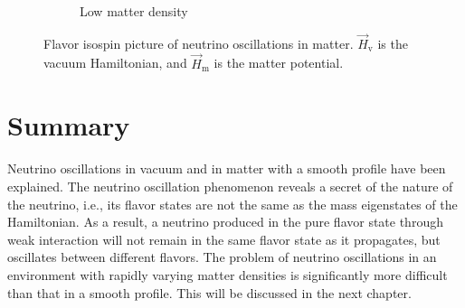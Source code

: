 \begin{figure}[htbp]
\begin{subfigure}[t]{0.3\textwidth}
    \vspace*{-0.05in}
		\caption{Low matter density}\label{chap:basics-sec:flavor-isospin-pic-fig:msw-adiabatic-small-density}
	\end{subfigure}
	\caption{Flavor isospin picture of neutrino oscillations in matter. $\vec H_{\mathrm v}$ is the vacuum Hamiltonian, and $\vec H_{\mathrm m}$ is the matter potential.}\label{chap:basics-sec:flavor-isospin-pic-fig:msw-adiabatic}
\end{figure}






\section{Summary}

Neutrino oscillations in vacuum and in matter with a smooth profile have been explained. The neutrino oscillation phenomenon reveals a secret of the nature of the neutrino, i.e., its flavor states are not the same as the mass eigenstates of the Hamiltonian.
As a result, a neutrino produced in the pure flavor state through weak interaction will not remain in the same flavor state as it propagates, but oscillates between different flavors. The problem of neutrino oscillations in an environment with rapidly varying matter densities is significantly more difficult than that in a smooth profile. This will be discussed in the next chapter.
